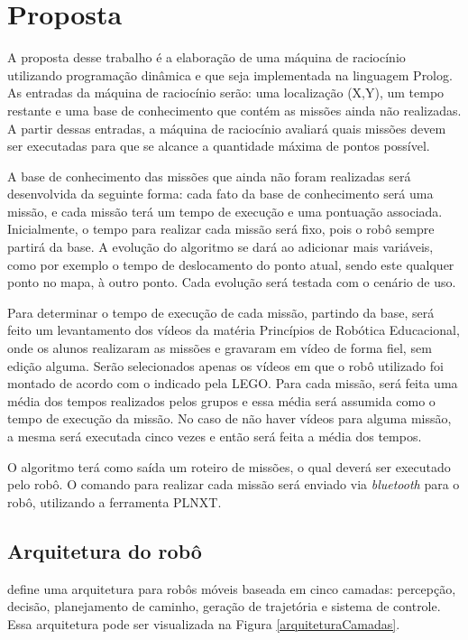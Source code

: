 \chapter{Proposta}
A proposta desse trabalho é a elaboração de uma máquina de raciocínio utilizando programação dinâmica e que seja implementada na linguagem Prolog. As entradas da máquina de raciocínio serão: uma localização (X,Y), um tempo restante e uma base de conhecimento que contém as missões ainda não realizadas. A partir dessas entradas, a máquina de raciocínio avaliará quais missões devem ser executadas para que se alcance a quantidade máxima de pontos possível.

A base de conhecimento das missões que ainda não foram realizadas será desenvolvida da seguinte forma: cada fato da base de conhecimento será uma missão, e cada missão terá um tempo de execução e uma pontuação associada. Inicialmente, o tempo para realizar cada missão será fixo, pois o robô sempre partirá da base. A evolução do algoritmo se dará ao adicionar mais variáveis, como por exemplo o tempo de deslocamento do ponto atual, sendo este qualquer ponto no mapa, à outro ponto. Cada evolução será testada com o cenário de uso.

Para determinar o tempo de execução de cada missão, partindo da base, será feito um levantamento dos vídeos da matéria Princípios de Robótica Educacional, onde os alunos realizaram as missões e gravaram em vídeo de forma fiel, sem edição alguma. Serão selecionados apenas os vídeos em que o robô utilizado foi montado de acordo com o indicado pela LEGO. Para cada missão, será feita uma média dos tempos realizados pelos grupos e essa média será assumida como o tempo de execução da missão. No caso de não haver vídeos para alguma missão, a mesma será executada cinco vezes e então será feita a média dos tempos.

O algoritmo terá como saída um roteiro de missões, o qual deverá ser executado pelo robô. O comando para realizar cada missão será enviado via \textit{bluetooth} para o robô, utilizando a ferramenta PLNXT.

\section{Arquitetura do robô}
 define uma arquitetura para robôs móveis baseada em cinco camadas: percepção, decisão, planejamento de caminho, geração de trajetória e sistema de controle. Essa arquitetura pode ser visualizada na Figura \ref{arquiteturaCamadas}.
\clearpage


